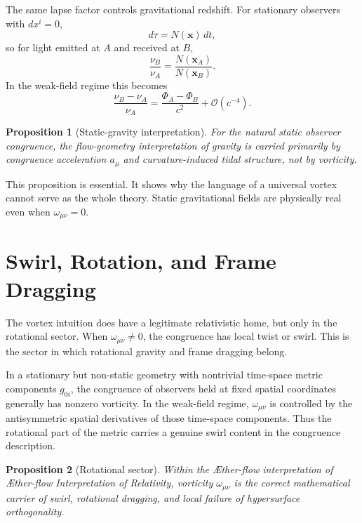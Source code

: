 \documentclass[11pt]{article}
\newcommand{\Aflow}{\AE{}ther-flow}
\newcommand{\TheoryName}{\Aflow{} Interpretation of Relativity}
\newtheorem{proposition}{Proposition}
\begin{document}
The same lapse factor controls gravitational redshift. For stationary observers with \(dx^i=0\),
\begin{equation}
d\tau = N(\mathbf{x})\,dt,
\label{eq:stationarytime}
\end{equation}
so for light emitted at \(A\) and received at \(B\),
\begin{equation}
\frac{\nu_B}{\nu_A}
=
\frac{N(\mathbf{x}_A)}{N(\mathbf{x}_B)}.
\label{eq:redshift}
\end{equation}
In the weak-field regime this becomes
\begin{equation}
\frac{\nu_B-\nu_A}{\nu_A}
=
\frac{\Phi_A-\Phi_B}{c^2}
+\mathcal{O}(c^{-4}).
\label{eq:redshiftweakfield}
\end{equation}

\begin{proposition}[Static-gravity interpretation]
For the natural static observer congruence, the flow-geometry interpretation of gravity is carried primarily by congruence acceleration \(a_\mu\) and curvature-induced tidal structure, not by vorticity.
\end{proposition}

This proposition is essential. It shows why the language of a universal vortex cannot serve as the whole theory. Static gravitational fields are physically real even when \(\omega_{\mu\nu}=0\).

\section{Swirl, Rotation, and Frame Dragging}

The vortex intuition does have a legitimate relativistic home, but only in the rotational sector. When \(\omega_{\mu\nu}\neq 0\), the congruence has local twist or swirl. This is the sector in which rotational gravity and frame dragging belong.

In a stationary but non-static geometry with nontrivial time-space metric components \(g_{0i}\), the congruence of observers held at fixed spatial coordinates generally has nonzero vorticity. In the weak-field regime, \(\omega_{\mu\nu}\) is controlled by the antisymmetric spatial derivatives of those time-space components. Thus the rotational part of the metric carries a genuine swirl content in the congruence description.

\begin{proposition}[Rotational sector]
Within the \Aflow{} interpretation of \TheoryName{}, vorticity \(\omega_{\mu\nu}\) is the correct mathematical carrier of swirl, rotational dragging, and local failure of hypersurface orthogonality.
\end{proposition}
\end{document}
